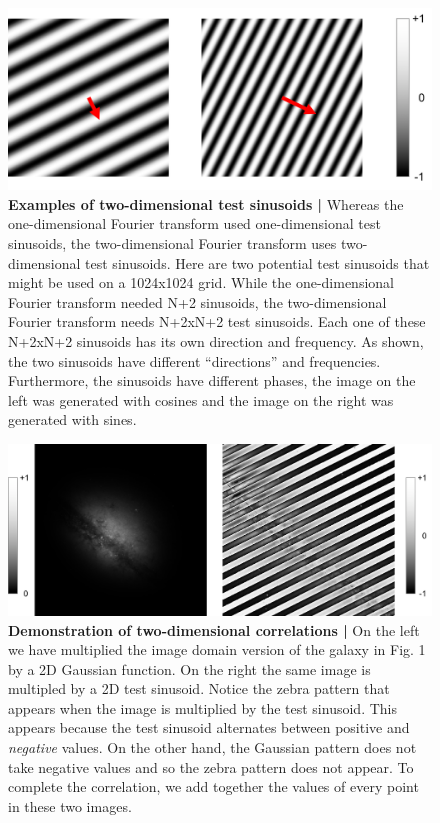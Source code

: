 \documentclass[12pt,a4paper]{article}
\begin{document}
\begin{figure}
\centering
\includegraphics[width=\textwidth]{_images/TwoTestSinusoids.png}
\caption{\textbf{Examples of two-dimensional test sinusoids |} Whereas the one-dimensional Fourier transform used one-dimensional test sinusoids, the two-dimensional Fourier transform uses two-dimensional test sinusoids. Here are two potential test sinusoids that might be used on a 1024x1024 grid. While the one-dimensional Fourier transform needed N+2 sinusoids, the two-dimensional Fourier transform needs N+2xN+2 test sinusoids. Each one of these N+2xN+2 sinusoids has its own direction and frequency. As shown, the two sinusoids have different ``directions'' and frequencies. Furthermore, the sinusoids have different phases, the image on the left was generated with cosines and the image on the right was generated with sines.}
\end{figure}


\begin{figure}
\centering
\includegraphics[width=\textwidth]{_images/ModulatedBWGalax.png}
\caption{\textbf{Demonstration of two-dimensional correlations |} On the left we have multiplied the image domain version of the galaxy in Fig. 1 by a 2D Gaussian function. On the right the same image is multipled by a 2D test sinusoid. Notice the zebra pattern that appears when the image is multiplied by the test sinusoid. This appears because the test sinusoid alternates between positive and \textit{negative} values. On the other hand, the Gaussian pattern does not take negative values and so the zebra pattern does not appear. To complete the correlation, we add together the values of every point in these two images.}
\end{figure}
\end{document}
